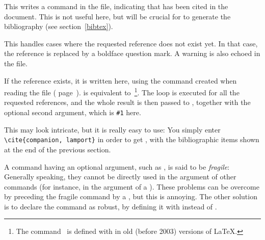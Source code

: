 \begin{listingcont}
     \if@filesw\immediate\write\@auxout{\string\citation{\@citeb}}\fi
\end{listingcont}
%
This writes a  command in the  file, indicating
that  has been cited in the document. This is not useful
here, but will be crucial for \bt to generate the bibliography (see
section~\ref{bibtex}).

\begin{listingcont}
\end{listingcont}
%
This handles cases where the requested reference does not exist yet. In
that case, the reference is replaced by a boldface question mark. A
warning is also echoed in the  file.

\begin{listingcont}
       {}}}{#1}}
\end{listingcont}
If the reference exists, it is written here, using the 
 command created when reading the  file (\cf
page~\pageref{bibcite}). 
 is equivalent to~\footnote{The
command~ is defined with  in old (before 2003) versions
of \LaTeX.}.
The loop is executed for all the requested
references, and the whole result is then passed to ,
together with the optional second argument, which is \verb+#1+ here. 

\medskip
This may look intricate, but it is really easy to use: You simply 
enter \verb+\cite{companion, lamport}+ in order to get \cite{latex:lc,
  latex:dps}, with the bibliographic items shown at the end of the previous
  section. 



\label{truc1}

\label{DRC}

A command having an optional argument, such as , is said to
be \emph{fragile}: Generally speaking, they cannot be directly used
in the argument of other commands (for instance,  in the
argument of a ). These problems can be overcome by preceding
the fragile command by a , but this is annoying. The
other solution is to declare the command as robust, by defining it
with  instead of .


